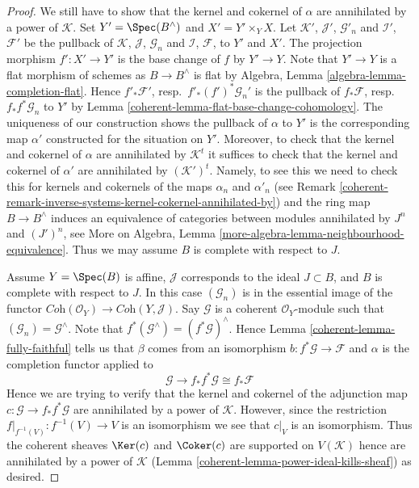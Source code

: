 \begin{proof}
\medskip\noindent
We still have to show that the kernel and cokernel of $\alpha$ are
annihilated by a power of $\mathcal{K}$. Set $Y' = \Spec(B^\wedge)$
and $X' = Y' \times_Y X$. Let $\mathcal{K}'$, $\mathcal{J}'$, $\mathcal{G}'_n$
and $\mathcal{I}'$, $\mathcal{F}'$ be the pullback of
$\mathcal{K}$, $\mathcal{J}$, $\mathcal{G}_n$ and
$\mathcal{I}$, $\mathcal{F}$, to $Y'$ and $X'$.
The projection morphism $f' : X' \to Y'$ is the base change of
$f$ by $Y' \to Y$. Note that $Y' \to Y$ is a flat morphism of schemes
as $B \to B^\wedge$ is flat by
Algebra, Lemma \ref{algebra-lemma-completion-flat}.
Hence $f'_*\mathcal{F}'$, resp.\ $f'_*(f')^*\mathcal{G}_n'$
is the pullback of $f_*\mathcal{F}$, resp.\ $f_*f^*\mathcal{G}_n$
to $Y'$ by Lemma \ref{coherent-lemma-flat-base-change-cohomology}.
The uniqueness of our construction shows the pullback of $\alpha$ to $Y'$
is the corresponding map $\alpha'$ constructed for the situation on $Y'$.
Moreover, to check that the kernel and cokernel of $\alpha$ are
annihilated by $\mathcal{K}^t$ it suffices to check that the
kernel and cokernel of $\alpha'$ are annihilated by
$(\mathcal{K}')^t$. Namely, to see this we need to check this for
kernels and cokernels of the maps $\alpha_n$ and $\alpha'_n$
(see Remark \ref{coherent-remark-inverse-systems-kernel-cokernel-annihilated-by})
and the ring map $B \to B^\wedge$ induces
an equivalence of categories between modules annihilated by
$J^n$ and $(J')^n$, see
More on Algebra, Lemma \ref{more-algebra-lemma-neighbourhood-equivalence}.
Thus we may assume $B$ is complete with respect to $J$.

\medskip\noindent
Assume $Y = \Spec(B)$ is affine, $\mathcal{J}$ corresponds to the ideal
$J \subset B$, and $B$ is complete with respect to $J$.
In this case $(\mathcal{G}_n)$ is in the essential image of the functor
$\textit{Coh}(\mathcal{O}_Y) \to \textit{Coh}(Y, \mathcal{J})$.
Say $\mathcal{G}$ is a coherent $\mathcal{O}_Y$-module such that
$(\mathcal{G}_n) = \mathcal{G}^\wedge$. Note that
$f^*(\mathcal{G}^\wedge) = (f^*\mathcal{G})^\wedge$. Hence
Lemma \ref{coherent-lemma-fully-faithful}
tells us that $\beta$ comes from an isomorphism
$b : f^*\mathcal{G} \to \mathcal{F}$
and $\alpha$ is the completion functor applied to
$$
\mathcal{G} \to f_*f^*\mathcal{G} \cong f_*\mathcal{F}
$$
Hence we are trying to verify that the kernel and cokernel of the
adjunction map $c : \mathcal{G} \to f_*f^*\mathcal{G}$ are annihilated by
a power of $\mathcal{K}$. However, since the restriction
$f|_{f^{-1}(V)} : f^{-1}(V) \to V$ is an isomorphism
we see that $c|_V$ is an isomorphism. Thus the coherent sheaves
$\Ker(c)$ and $\Coker(c)$ are supported on $V(\mathcal{K})$
hence are annihilated by a power of $\mathcal{K}$
(Lemma \ref{coherent-lemma-power-ideal-kills-sheaf}) as desired.
\end{proof}

